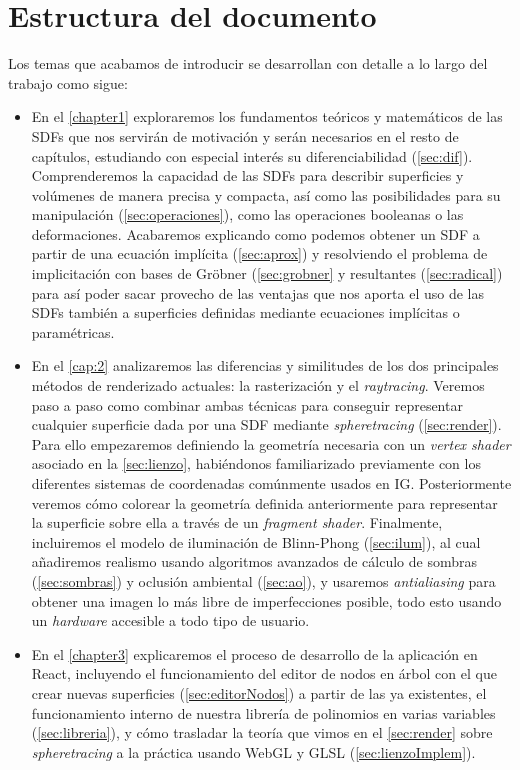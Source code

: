 \section*{Estructura del documento}
Los temas que acabamos de introducir se desarrollan con detalle a lo largo del trabajo como sigue:
\begin{itemize}
    \item En el \autoref{chapter1} exploraremos los fundamentos teóricos y matemáticos de las SDFs que nos servirán de motivación y serán necesarios en el resto de capítulos, estudiando con especial interés su diferenciabilidad (\autoref{sec:dif}). Comprenderemos la capacidad de las SDFs para describir superficies y volúmenes de manera precisa y compacta, así como las posibilidades para su manipulación (\autoref{sec:operaciones}), como las operaciones booleanas o las deformaciones. Acabaremos explicando como podemos obtener un SDF a partir de una ecuación implícita (\autoref{sec:aprox}) y resolviendo el problema de implicitación con bases de Gröbner (\autoref{sec:grobner} y resultantes (\autoref{sec:radical}) para así poder sacar provecho de las ventajas que nos aporta el uso de las SDFs también a superficies definidas mediante ecuaciones implícitas o paramétricas. 
    
    \item En el \autoref{cap:2} analizaremos las diferencias y similitudes de los dos principales métodos de renderizado actuales: la rasterización y el \textit{raytracing}. Veremos paso a paso como combinar ambas técnicas para conseguir representar cualquier superficie dada por una SDF mediante \textit{spheretracing} (\autoref{sec:render}). Para ello empezaremos definiendo la geometría necesaria con un \textit{vertex shader} asociado en la \autoref{sec:lienzo}, habiéndonos familiarizado previamente con los diferentes sistemas de coordenadas comúnmente usados en IG. Posteriormente veremos cómo colorear la geometría definida anteriormente para representar la superficie sobre ella a través de un \textit{fragment shader}. Finalmente, incluiremos el modelo de iluminación de Blinn-Phong (\autoref{sec:ilum}), al cual añadiremos realismo usando algoritmos avanzados de cálculo de sombras (\autoref{sec:sombras}) y oclusión ambiental (\autoref{sec:ao}), y usaremos \textit{antialiasing} para obtener una imagen lo más libre de imperfecciones posible, todo esto usando un \textit{hardware} accesible a todo tipo de usuario.
    
    \item En el \autoref{chapter3} explicaremos el proceso de desarrollo de la aplicación en React, incluyendo el funcionamiento del editor de nodos en árbol con el que crear nuevas superficies (\autoref{sec:editorNodos}) a partir de las ya existentes, el funcionamiento interno de nuestra librería de polinomios en varias variables (\autoref{sec:libreria}), y cómo trasladar la teoría que vimos en el \autoref{sec:render} sobre \textit{spheretracing} a la práctica usando WebGL y GLSL (\autoref{sec:lienzoImplem}).
    

\end{itemize}
